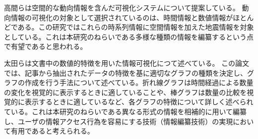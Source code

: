\documentclass{matsushita-zemi}
\begin{document}
高間らは空間的な動向情報を含んだ可視化システムについて提案している\cite{SpaceTrendInformation}。
動向情報の可視化の対象として選択されているのは、時間情報と数値情報がほとんどである。この研究ではこれらの時系列情報に空間情報を加えた地震情報を対象としている。これは本研究のねらいである多様な種類の情報を編纂するという点で有望であると思われる。


太田らは文書中の数値的特徴を用いた情報可視化につて述べている\cite{numerical_features}。
この論文では、記事から抽出されたデータの特徴を基に適切なグラフの種類を決定し、グラフの作成を行う手法について述べている。折れ線グラフは時間経過による数量の変化を視覚的に表示するときに適していることや、棒グラフは数量の比較を視覚的に表示するときに適しているなど、各グラフの特徴について詳しく述べられている。これは本研究のねらいである異なる形式の情報を相補的に用いて編纂し、ユーザの情報アクセス行為を容易にする技術（情報編纂技術）の実現において有用であると考えられる。
\end{document}
